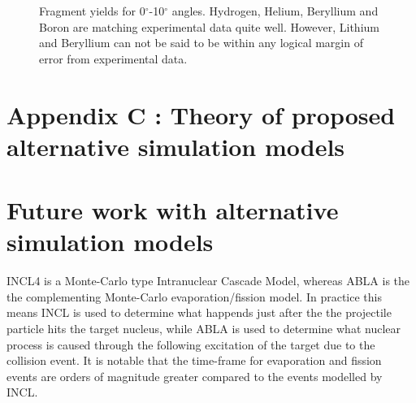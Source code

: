 \begin{figure}[!ht]
{\label{fig:fragmentYieldsForB}
}
\label{fig:fragmentYieldsZeroToTenDegrees}
\caption[Optional caption for list of figures]{Fragment yields for 0$^{\circ}$-10$^{\circ}$ angles. Hydrogen, Helium, Beryllium and Boron are matching experimental data quite well. However, Lithium and Beryllium can not be said to be within any logical margin of error from experimental data.}
\end{figure}





















\clearpage
\section*{Appendix C \label{AppendixC}: Theory of proposed alternative simulation models}
\renewcommand{\theequation}{C\arabic{equation}}
\setcounter{equation}{0}  
\renewcommand{\thefigure}{C\arabic{figure}}
\setcounter{figure}{0}
\renewcommand{\thetable}{C\arabic{table}}
\setcounter{table}{0}
\renewcommand{\thesection}{C}
\setcounter{section}{1}
\setcounter{subsection}{0}
\section*{Future work with alternative simulation models \label{appendixincltheory}}

INCL4 is a Monte-Carlo type Intranuclear Cascade Model, whereas ABLA is the the complementing Monte-Carlo evaporation/fission model. In practice this means INCL is used to determine what happends just after the the projectile particle hits the target nucleus, while ABLA is used to determine what nuclear process is caused through the following excitation of the target due to the collision event. It is notable that the time-frame for evaporation and fission events are orders of magnitude greater compared to the events modelled by INCL.

